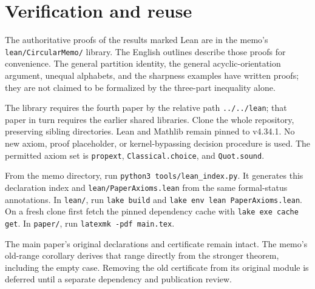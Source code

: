 \section{Verification and reuse}\label{sec:verification}

The authoritative proofs of the results marked \textsf{Lean} are in
the memo's \texttt{lean/CircularMemo/} library. The English outlines
describe those proofs for convenience. The general partition identity,
the general acyclic-orientation argument, unequal alphabets, and the
sharpness examples have written proofs; they are not claimed to be
formalized by the three-part inequality alone.

The library requires the fourth paper by the relative path
\texttt{../../lean}; that paper in turn requires the earlier shared
libraries. Clone the whole repository, preserving sibling directories.
Lean and Mathlib remain pinned to v4.34.1. No new axiom, proof placeholder,
or kernel-bypassing decision procedure is used. The permitted axiom set
is \texttt{propext}, \texttt{Classical.choice}, and \texttt{Quot.sound}.

From the memo directory, run \texttt{python3 tools/lean\_index.py}.
It generates this declaration index and \texttt{lean/PaperAxioms.lean}
from the same formal-status annotations. In \texttt{lean/}, run
\texttt{lake build} and \texttt{lake env lean PaperAxioms.lean}.
On a fresh clone first fetch the pinned dependency cache with
\texttt{lake exe cache get}. In \texttt{paper/}, run
\texttt{latexmk -pdf main.tex}.

The main paper's original declarations and certificate remain intact.
The memo's old-range corollary derives that range directly from the
stronger theorem, including the empty case.
Removing the old certificate from its original module is deferred until
a separate dependency and publication review.
